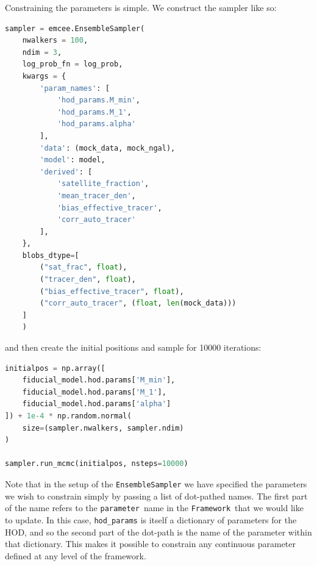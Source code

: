 \documentclass[5p,aas_macros]{elsarticle}
\newcommand{\framework}{\texttt{Framework}\xspace} %
\newcommand{\parameter}{\texttt{parameter}\xspace} %
\begin{document}
Constraining the parameters is simple. We construct the sampler like so:
\begin{lstlisting}[language=Python]
sampler = emcee.EnsembleSampler(
	nwalkers = 100,
	ndim = 3,
	log_prob_fn = log_prob,
	kwargs = {
		'param_names': [
			'hod_params.M_min', 
			'hod_params.M_1', 
			'hod_params.alpha'
		],  
		'data': (mock_data, mock_ngal), 
		'model': model,  
		'derived': [
			'satellite_fraction', 
			'mean_tracer_den',
			'bias_effective_tracer',
			'corr_auto_tracer'
		],
	},
	blobs_dtype=[
		("sat_frac", float), 
		("tracer_den", float), 
		("bias_effective_tracer", float),
		("corr_auto_tracer", (float, len(mock_data)))
	]
	)
\end{lstlisting}

and then create the initial positions and sample for 10000 iterations:
%
\begin{lstlisting}[language=Python]
initialpos = np.array([
	fiducial_model.hod.params['M_min'], 
	fiducial_model.hod.params['M_1'],
	fiducial_model.hod.params['alpha']
]) + 1e-4 * np.random.normal(
	size=(sampler.nwalkers, sampler.ndim)
)
	
sampler.run_mcmc(initialpos, nsteps=10000)
\end{lstlisting}
Note that in the setup of the \verb|EnsembleSampler| we have specified the parameters we wish to constrain simply by passing a list of dot-pathed names.
The first part of the name refers to the \parameter\ name in the \framework\ that we would like to update. In this case, \verb|hod_params| is itself a dictionary of parameters for the HOD, and so the second part of the dot-path is the name of the parameter within that dictionary. This makes it possible to constrain any continuous parameter defined at any level of the framework.
\end{document}
